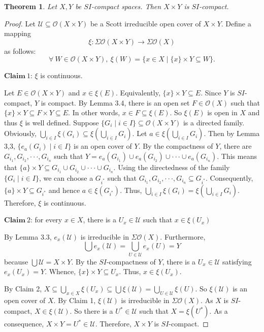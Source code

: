 \documentclass[preprint,12pt]{elsarticle}
\numberwithin{equation}{section}
\newtheorem{theorem}{Theorem}[section]
\begin{document}
\begin{theorem}{\rm Let $X,Y$ be $SI$-compact spaces. Then $X\times Y$ is $SI$-compact.}
\end{theorem}
\begin{proof} Let $\mathcal{U}\subseteq\mathcal{O}(X\times Y)$ be a Scott irreducible open cover of $X\times Y$. Define a mapping $$\xi:\Sigma\mathcal{O}(X\times Y)\longrightarrow\Sigma\mathcal{O}(X)$$ as follows:
$$\forall\ W\in\mathcal{O}(X\times Y),\ \xi(W)=\{x\in X\mid \{x\}\times Y\subseteq W\}.$$

$\mathbf{Claim} \ 1$: $\xi$ is continuous.

Let $E\in\mathcal{O}(X\times Y)$ and $x\in \xi(E)$. Equivalently, $\{x\}\times Y\subseteq E$. Since $Y$ is $SI$-compact, $Y$ is compact. By Lemma 3.4, there is an open set $F\in\mathcal{O}(X)$ such that $\{x\}\times Y\subseteq F\times Y\subseteq E$. In other words, $x\in F\subseteq\xi(E)$. So $\xi(E)$ is open in $X$ and thus $\xi$ is well defined. Suppose $\{G_{i}\mid i\in I\}\subseteq\mathcal{O}(X\times Y)$ is a directed family. Obviously, $\bigcup\limits_{i\in I}\xi(G_{i})\subseteq \xi(\bigcup\limits_{i\in I}G_{i})$. Let $a\in\xi(\bigcup\limits_{i\in I}G_{i})$. Then by Lemma 3,3, $\{e_{a}(G_{i})\mid i\in I\}$ is an open cover of $Y$. By the compactness of $Y$, there are $G_{i_{1}},G_{i_{2}},\cdot\cdot\cdot,G_{i_{n}}$ such that $Y=e_{a}(G_{i_{1}})\cup e_{a}(G_{i_{2}})\cup\cdot\cdot\cdot\cup e_{a}(G_{i_{n}})$. This means that $\{a\}\times Y\subseteq G_{i_{1}}\cup G_{i_{2}}\cup\cdot\cdot\cdot\cup G_{i_{n}}$. Using the directedness of the family $\{G_{i}\mid i\in I\}$, we can choose a $G_{i^{\ast}}$ such that $G_{i_{1}},G_{i_{2}},\cdot\cdot\cdot,G_{i_{n}}\subseteq G_{i^{\ast}}$. Consequently, $\{a\}\times Y\subseteq G_{i^{\ast}}$ and hence $a\in\xi(G_{i^{\ast}})$. Thus, $\bigcup\limits_{i\in I}\xi(G_{i})=\xi(\bigcup\limits_{i\in I}G_{i})$. Therefore, $\xi$ is continuous.


$\mathbf{Claim}\ 2$: for every $x\in X$, there is a $U_{x}\in\mathcal{U}$ such that $x\in \xi(U_{x})$

By Lemma 3.3, $e_{x}(\mathcal{U})$ is irreducible in $\Sigma\mathcal{O}(X)$. Furthermore, $$\bigcup e_{x}(\mathcal{U})=\bigcup\limits_{U\in\mathcal{U}}e_{x}(U)=Y$$ because $\bigcup\mathcal{U}=X\times Y$. By the $SI$-compactness of $Y$, there is a $U_{x}\in\mathcal{U}$ satisfying $e_{x}(U_{x})=Y$. Whence, $\{x\}\times Y\subseteq U_{x}$. Thus, $x\in\xi(U_{x})$.

By Claim 2, $X\subseteq\bigcup\limits_{x\in X}\xi(U_{x})\subseteq\bigcup\xi(\mathcal{U})=\bigcup\limits_{U\in\mathcal{U}}\xi(U)$. So $\xi(\mathcal{U})$ is an open cover of $X$. By Claim 1, $\xi(\mathcal{U})$ is irreducible in $\Sigma\mathcal{O}(X)$. As $X$ is $SI$-compact, $X\in\xi(\mathcal{U})$. So there is a $U^{\ast}\in\mathcal{U}$ such that $X=\xi(U^{\ast})$. As a consequence, $X\times Y=U^{\ast}\in\mathcal{U}$. Therefore, $X\times Y$ is $SI$-compact.
\end{proof}
\end{document}
